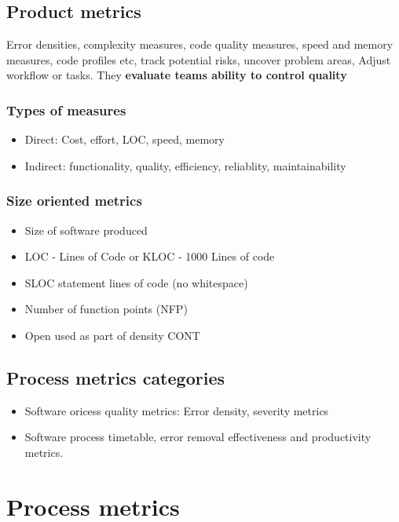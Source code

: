 \documentclass{article}
\begin{document}
\subsection{Product metrics}

\begin{flushleft}
Error densities, complexity measures, code quality measures, speed and memory measures, code profiles etc, track potential risks, uncover problem areas, Adjust workflow or tasks. They \textbf{evaluate teams ability to control quality}
\end{flushleft}

\subsubsection{Types of measures}
\begin{itemize}
  \item Direct: Cost, effort, LOC, speed, memory
  \item Indirect: functionality, quality, efficiency, reliablity, maintainability 
\end{itemize}


\subsubsection{Size oriented metrics}
\begin{itemize}
  \item Size of software produced
  \item LOC - Lines of Code or KLOC - 1000 Lines of code
  \item SLOC statement lines of code (no whitespace)
  \item Number of function points (NFP)
  \item Open used as part of density CONT
\end{itemize}

\subsection{Process metrics categories}
\begin{itemize}
  \item Software oricess quality metrics: Error density, severity metrics
  \item Software process timetable, error removal effectiveness and productivity metrics.
\end{itemize}

\section{Process metrics}
\end{document}

